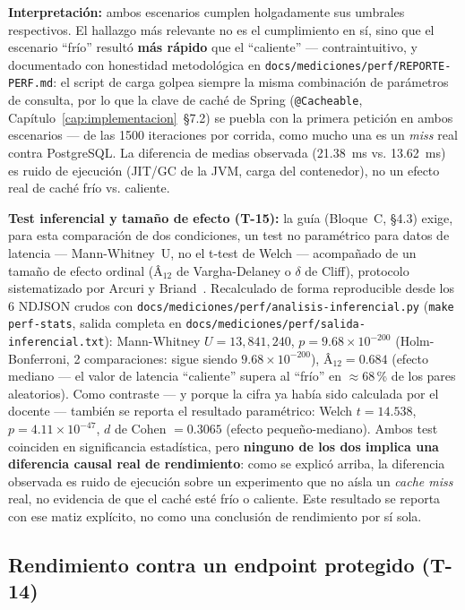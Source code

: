 \textbf{Interpretación:} ambos escenarios cumplen holgadamente sus
umbrales respectivos. El hallazgo más relevante no es el cumplimiento en
sí, sino que el escenario ``frío'' resultó \textbf{más rápido} que el
``caliente'' --- contraintuitivo, y documentado con honestidad
metodológica en \texttt{docs/mediciones/perf/REPORTE-PERF.md}: el script
de carga golpea siempre la misma combinación de parámetros de consulta,
por lo que la clave de caché de Spring (\texttt{@Cacheable},
Capítulo~\ref{cap:implementacion}~\S7.2) se puebla con la primera
petición en ambos escenarios --- de las 1500 iteraciones por corrida, como
mucho una es un \emph{miss} real contra PostgreSQL. La diferencia de
medias observada (21.38~ms vs. 13.62~ms) es ruido de ejecución (JIT/GC de
la JVM, carga del contenedor), no un efecto real de caché frío vs.
caliente.

\textbf{Test inferencial y tamaño de efecto (T-15):} la guía (Bloque~C,
\S4.3) exige, para esta comparación de dos condiciones, un test no
paramétrico para datos de latencia --- Mann-Whitney~U, no el t-test de
Welch --- acompañado de un tamaño de efecto ordinal (Â$_{12}$ de
Vargha-Delaney o $\delta$ de Cliff), protocolo sistematizado por Arcuri y
Briand~\cite{ARCURI2011}. Recalculado de forma reproducible desde los 6
NDJSON crudos con \texttt{docs/mediciones/perf/analisis-inferencial.py}
(\texttt{make perf-stats}, salida completa en
\texttt{docs/mediciones/perf/salida-inferencial.txt}):
Mann-Whitney $U=13{,}841{,}240$, $p=9.68\times10^{-200}$ (Holm-Bonferroni,
2 comparaciones: sigue siendo $9.68\times10^{-200}$), Â$_{12}=0.684$
(efecto mediano --- el valor de latencia ``caliente'' supera al ``frío''
en $\approx$68\,\% de los pares aleatorios). Como contraste --- y porque
la cifra ya había sido calculada por el docente --- también se reporta el
resultado paramétrico: Welch $t=14.538$, $p=4.11\times10^{-47}$, $d$ de
Cohen $=0.3065$ (efecto pequeño-mediano). Ambos test coinciden en
significancia estadística, pero \textbf{ninguno de los dos implica una
diferencia causal real de rendimiento}: como se explicó arriba, la
diferencia observada es ruido de ejecución sobre un experimento que no
aísla un \emph{cache miss} real, no evidencia de que el caché esté frío o
caliente. Este resultado se reporta con ese matiz explícito, no como una
conclusión de rendimiento por sí sola.

\subsection{Rendimiento contra un endpoint protegido (T-14)}


